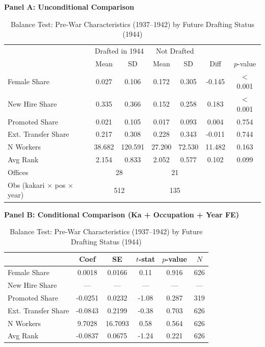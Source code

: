 \begin{table}[H]
\centering
\caption{Balance Test: Pre-War Characteristics (1937--1942) by Future Drafting Status (1944)}
\label{tab:balance}
\small
\begin{threeparttable}

\textbf{Panel A: Unconditional Comparison}
\medskip

\begin{tabular}{lcccccc}
\toprule
 & \multicolumn{2}{c}{Drafted in 1944} & \multicolumn{2}{c}{Not Drafted} & & \\
 & Mean & SD & Mean & SD & Diff & $p$-value \\
\midrule
Female Share & 0.027 & 0.106 & 0.172 & 0.305 & -0.145 & $<$0.001 \\
New Hire Share & 0.335 & 0.366 & 0.152 & 0.258 & 0.183 & $<$0.001 \\
Promoted Share & 0.021 & 0.105 & 0.017 & 0.093 & 0.004 & 0.754 \\
Ext. Transfer Share & 0.217 & 0.308 & 0.228 & 0.343 & -0.011 & 0.744 \\
N Workers & 38.682 & 120.591 & 27.200 & 72.530 & 11.482 & 0.163 \\
Avg Rank & 2.154 & 0.833 & 2.052 & 0.577 & 0.102 & 0.099 \\
\midrule
Offices & \multicolumn{2}{c}{28} & \multicolumn{2}{c}{21} & & \\
Obs (kakari $\times$ pos $\times$ year) & \multicolumn{2}{c}{512} & \multicolumn{2}{c}{135} & & \\
\bottomrule
\end{tabular}

\bigskip

\textbf{Panel B: Conditional Comparison (Ka + Occupation + Year FE)}
\medskip

\begin{tabular}{lccccc}
\toprule
 & Coef & SE & $t$-stat & $p$-value & $N$ \\
\midrule
Female Share & 0.0018 & 0.0166 & 0.11 & 0.916 & 626 \\
New Hire Share & --- & --- & --- & --- & --- \\
Promoted Share & -0.0251 & 0.0232 & -1.08 & 0.287 & 319 \\
Ext. Transfer Share & -0.0843 & 0.2199 & -0.38 & 0.703 & 626 \\
N Workers & 9.7028 & 16.7093 & 0.58 & 0.564 & 626 \\
Avg Rank & -0.0837 & 0.0675 & -1.24 & 0.221 & 626 \\
\bottomrule
\end{tabular}


\end{threeparttable}
\end{table}
